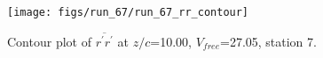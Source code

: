 \begin{figure}[H]
\centering
\texttt{[image: figs/run\_67/run\_67\_rr\_contour]}
\caption{Contour plot of $\overline{r^\prime r^\prime}$ at $z/c$=10.00, $V_{free}$=27.05, station 7.}
\end{figure}


